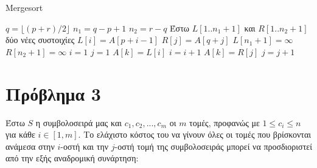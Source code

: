 \documentclass{article}
\begin{document}
\begin{algorithm}

\renewcommand{\algorithmicif}{\textbf{\foreignlanguage{greek}{Αν}}}
\renewcommand{\algorithmicfor}{\textbf{\foreignlanguage{greek}{Για}}}
\renewcommand{\algorithmicend}{\textbf{\foreignlanguage{greek}{Τέλος}}}
\renewcommand{\algorithmicdo}{}
\renewcommand{\algorithmicthen}{\textbf{\foreignlanguage{greek}{τότε}}}
\renewcommand{\algorithmicreturn}{\textbf{\foreignlanguage{greek}{Επίστρεψε}}}
\renewcommand{\algorithmicelse}{\textbf{\foreignlanguage{greek}{Αλλιώς}}}
\renewcommand{\algorithmicprocedure}{}

\caption{Mergesort} \label{alg:mergesort}
\begin{algorithmic}[1]
    \State $q = \lfloor (p+r)/2 \rfloor$
    \State {}
    \State {}
    \State {}
\EndIf
\EndProcedure
\Statex
{}
    \State $n_1 = q-p+1$
    \State $n_2 = r-q$
    \State \foreignlanguage{greek}{Έστω $L[1..n_1+1]$ και $R[1..n_2+1]$ δύο νέες συστοιχίες}
        \State $L[i] = A[p+i-1]$
    \EndFor
{}
        \State $R[j] = A[q+j]$
    \EndFor
    \State $L[n_1+1] = \infty$
    \State $R[n_2+1] = \infty$
    \State $i=1$
    \State $j=1$
            \State $A[k] = L[i]$
            \State $i=i+1$
        \Else
            \State $A[k] = R[j]$
            \State $j = j+1$
        \EndIf
    \EndFor
\EndProcedure
\end{algorithmic}    
\end{algorithm}

\pagebreak

\section*{Πρόβλημα 3}
Έστω $S$ η συμβολοσειρά μας και ${c_1, c_2, ..., c_m}$ οι $m$ τομές, προφανώς με $1 \leq c_i \leq n$ για κάθε $i \in [1,m]$. Το ελάχιστο κόστος του να γίνουν όλες οι τομές που βρίσκονται ανάμεσα στην $i$-οστή και την $j$-οστή τομή της συμβολοσειράς μπορεί να προσδιοριστεί από την εξής αναδρομική συνάρτηση:
\end{document}
